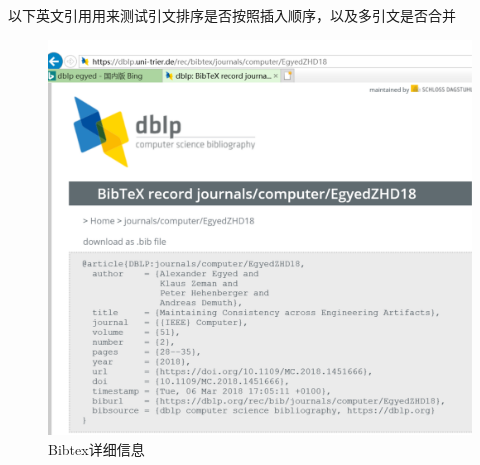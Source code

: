 以下英文引用用来测试引文排序是否按照插入顺序，以及多引文是否合并~\cite{DBLP:journals/computer/EgyedZHD18, DBLP:journals/ml/TingZCZWZ19}

\begin{figure}[htb]
  \centering
  \includegraphics[width=5in]{FIGs/chapter7/bibtexDetail.pdf}
  \caption{Bibtex详细信息}\label{fig_bibtexDetailCH7}
\end{figure}

